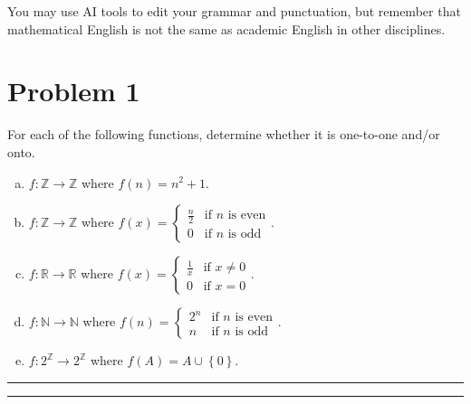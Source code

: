 \documentclass{article}
\theoremstyle{definition}
\newenvironment{solution}{\bigskip\hrule{\hfill}}{\bigskip\hrule{\hfill}} %
\begin{document}
You may use AI tools to edit your grammar and punctuation, but remember that mathematical English is not the same as academic English in other disciplines. 

\vfill

\newpage


\section*{Problem 1}
For each of the following functions, determine whether it is one-to-one and/or onto. 
\begin{enumerate}[a)] %
    \item $f:\mathbb{Z}\longrightarrow\mathbb{Z}$ where $f\left(n\right)=n^2+1$.
    \item $f:\mathbb{Z}\longrightarrow\mathbb{Z}$ where $f\left(x\right)=\begin{cases}\frac{n}{2} & \text{if $n$ is even} \\ 0 & \text{if $n$ is odd}\end{cases}$.
    \item $f:\mathbb{R}\longrightarrow\mathbb{R}$ where $f\left(x\right)=\begin{cases}\frac{1}{x} & \text{if }x\neq0 \\ 0 & \text{if }x=0\end{cases}$.
    \item $f:\mathbb{N}\longrightarrow\mathbb{N}$ where $f\left(n\right)=\begin{cases}2^n & \text{if $n$ is even} \\ n & \text{if $n$ is odd}\end{cases}$.
    \item $f:2^{\mathbb{Z}}\longrightarrow2^{\mathbb{Z}}$ where $f\left(A\right)=A\cup\left\{0\right\}$.
\end{enumerate}
\begin{solution}


\end{solution}

\end{document}
